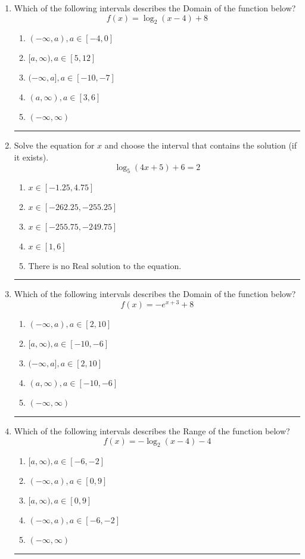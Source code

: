 \documentclass[14pt]{extbook}
\newcommand{\litem}[1]{\item#1\hspace*{-1cm}\rule{\textwidth}{0.4pt}}
\begin{document}
\begin{enumerate}
\litem{
Which of the following intervals describes the Domain of the function below?\[ f(x) = \log_2{(x-4)}+8 \]\begin{enumerate}[label=\Alph*.]
\item \( (-\infty, a), a \in [-4, 0] \)
\item \( [a, \infty), a \in [5, 12] \)
\item \( (-\infty, a], a \in [-10, -7] \)
\item \( (a, \infty), a \in [3, 6] \)
\item \( (-\infty, \infty) \)

\end{enumerate} }
\litem{
Solve the equation for $x$ and choose the interval that contains the solution (if it exists).\[ \log_{5}{(4x+5)}+6 = 2 \]\begin{enumerate}[label=\Alph*.]
\item \( x \in [-1.25, 4.75] \)
\item \( x \in [-262.25, -255.25] \)
\item \( x \in [-255.75, -249.75] \)
\item \( x \in [1, 6] \)
\item \( \text{There is no Real solution to the equation.} \)

\end{enumerate} }
\litem{
Which of the following intervals describes the Domain of the function below?\[ f(x) = -e^{x+3}+8 \]\begin{enumerate}[label=\Alph*.]
\item \( (-\infty, a), a \in [2, 10] \)
\item \( [a, \infty), a \in [-10, -6] \)
\item \( (-\infty, a], a \in [2, 10] \)
\item \( (a, \infty), a \in [-10, -6] \)
\item \( (-\infty, \infty) \)

\end{enumerate} }
\litem{
Which of the following intervals describes the Range of the function below?\[ f(x) = -\log_2{(x-4)}-4 \]\begin{enumerate}[label=\Alph*.]
\item \( [a, \infty), a \in [-6, -2] \)
\item \( (-\infty, a), a \in [0, 9] \)
\item \( [a, \infty), a \in [0, 9] \)
\item \( (-\infty, a), a \in [-6, -2] \)
\item \( (-\infty, \infty) \)


\end{enumerate}}
\end{enumerate}
\end{document}
